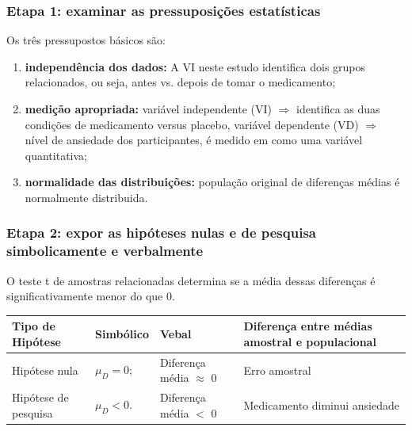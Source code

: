 \documentclass[11pt]{beamer}
\begin{document}
\begin{frame}
\frametitle{Etapa 1: examinar as pressuposições estatísticas}

Os três pressupostos básicos são:

\begin{enumerate}
\item \textbf{independência dos dados:} A VI neste estudo identifica dois grupos relacionados, ou seja, antes vs. depois de tomar o medicamento;
\item \textbf{medição apropriada:} variável independente (VI) \(\Rightarrow\) identifica as duas condições de medicamento versus placebo, variável dependente (VD) \(\Rightarrow\) nível de ansiedade dos participantes, é medido em como uma variável quantitativa;
\item \textbf{normalidade das distribuições:} população original de diferenças médias é normalmente distribuida.
\end{enumerate}

\end{frame}

\begin{frame}
\frametitle{Etapa 2: expor as hipóteses nulas e de pesquisa simbolicamente e verbalmente}

O teste t de amostras relacionadas determina se a média dessas diferenças é significativamente menor do que 0.

\begin{center}
\begin{tabular}{ m{2cm}|m{2cm}|m{3cm}|m{3cm} } 
 \hline
 Tipo de Hipótese & Simbólico & Vebal & Diferença entre médias amostral e populacional\\
  \hline
 Hipótese nula & $\mu_{D}=0;$ & Diferença média $\approx$ 0 & Erro amostral \\ 
 Hipótese de pesquisa & $\mu_{D} < 0.$ & Diferença média $<$ 0 & Medicamento diminui ansiedade  \\ 
 \hline
 \hline
\end{tabular}
\end{center}

\end{frame}
\end{document}
